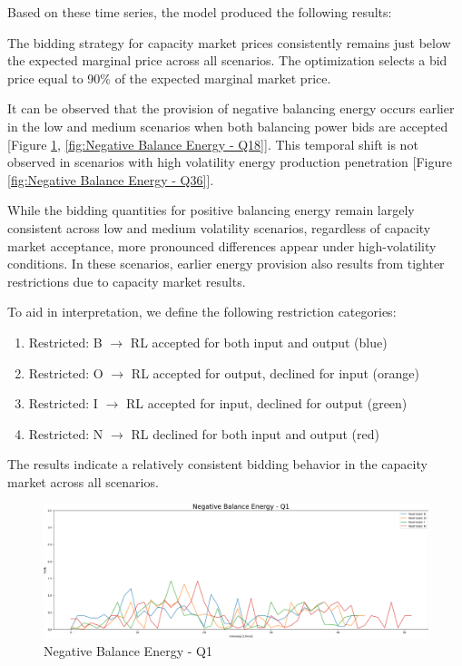 Based on these time series, the model produced the following results:

The bidding strategy for capacity market prices consistently remains just below the expected marginal price across all scenarios.
The optimization selects a bid price equal to 90\% of the expected marginal market price.

It can be observed that the provision of negative balancing energy occurs earlier in the low and medium scenarios
when both balancing power bids are accepted [Figure \ref{fig:Negative Balance Energy - Q1}, \ref{fig:Negative Balance Energy - Q18}].
This temporal shift is not observed in scenarios with high volatility energy production penetration [Figure \ref{fig:Negative Balance Energy - Q36}].

While the bidding quantities for positive balancing energy remain largely consistent across low and medium volatility scenarios,
regardless of capacity market acceptance, more pronounced differences appear under high-volatility conditions.
In these scenarios, earlier energy provision also results from tighter restrictions due to capacity market results.

To aid in interpretation, we define the following restriction categories:
\begin{enumerate}
	\item Restricted: B $\rightarrow$ RL accepted for both input and output (blue)
	\item Restricted: O $\rightarrow$ RL accepted for output, declined for input (orange)
	\item Restricted: I $\rightarrow$ RL accepted for input, declined for output (green)
	\item Restricted: N $\rightarrow$ RL declined for both input and output (red)
\end{enumerate}

The results indicate a relatively consistent bidding behavior in the capacity market across all scenarios.

\begin{figure}[!h]
	\includegraphics[width=1\linewidth]{pictures/results/Negative Balance Energy - Q1.png}
	\caption{Negative Balance Energy - Q1}
	\label{fig:Negative Balance Energy - Q1}
\end{figure}

